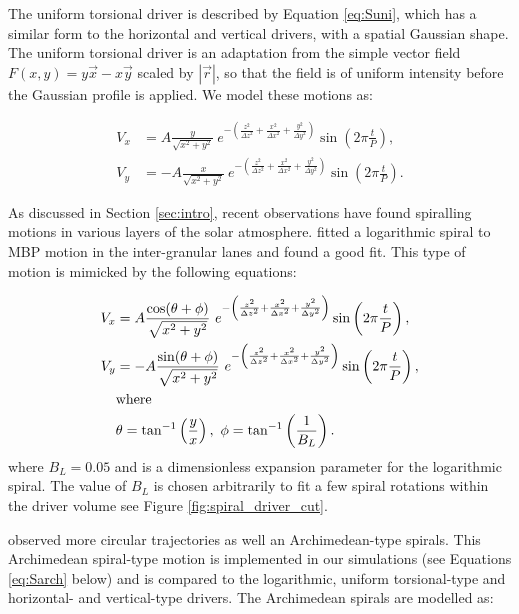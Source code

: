 The uniform torsional driver is described by Equation \ref{eq:Suni}, which has a similar form to the horizontal and vertical drivers, with a spatial Gaussian shape.
 The uniform torsional driver is an adaptation from the simple vector field $F(x,y) = y\vec{x} - x\vec{y}$ scaled by $|\vec{r}|$, so that the field is of uniform intensity before the Gaussian profile is applied. 
 We model these motions as:
 
\begin{subequations}
	\begin{align}
		V_x &= A \frac{y}{\sqrt{x^2 + y^2}}\ e^{-\left(\frac{z^2}{\Delta z^2} + \frac{x^2}{\Delta x^2} + \frac{y^2}{\Delta y^2}\right)} \sin \left(2\pi \frac{t}{P}\right), \label{eq:Suni}\\
		V_y &= - A \frac{x}{\sqrt{x^2 + y^2}}\ e^{-\left(\frac{z^2}{\Delta z^2} + \frac{x^2}{\Delta x^2} + \frac{y^2}{\Delta y^2}\right)} \sin \left(2\pi \frac{t}{P}\right).
	\end{align}
\end{subequations}

As discussed in Section \ref{sec:intro}, recent observations have found spiralling motions in various layers of the solar atmosphere.
 \citet{bonet2008} fitted a logarithmic spiral to MBP motion in the inter-granular lanes and found a good fit.
 This type of motion is mimicked by the following equations:
 
\begin{subequations}
\begin{align}
	V_x &= A \frac{\cos(\theta + \phi)}{\sqrt{x^2 + y^2}}\ e^{-\left(\frac{z^2}{\Delta z^2} + \frac{x^2}{\Delta x^2} + \frac{y^2}{\Delta y^2}\right)} \sin \left(2\pi \frac{t}{P}\right),\\
	V_y &= - A \frac{\sin(\theta + \phi)}{\sqrt{x^2 + y^2}}\ e^{-\left(\frac{z^2}{\Delta z^2} + \frac{x^2}{\Delta x^2} + \frac{y^2}{\Delta y^2}\right)} \sin \left(2\pi \frac{t}{P}\right),\label{eq:Slog}\\
		&\text{where}\notag\\
		&\theta = \tan^{-1}\left(\frac{y}{x}\right),\ \phi = \tan^{-1}\left(\frac{1}{B_L}\right).\notag	
\end{align}
\end{subequations}
where $B_L = 0.05$ and is a dimensionless expansion parameter for the logarithmic spiral. The value of $B_L$ is chosen arbitrarily to fit a few spiral rotations within the driver volume see Figure \ref{fig:spiral_driver_cut}.

\citet{wedemeyer-boehm2009} observed more circular trajectories as well an Archimedean-type spirals.
 This Archimedean spiral-type motion is implemented in our simulations (see Equations \ref{eq:Sarch} below) and is compared to the logarithmic, uniform torsional-type and horizontal- and vertical-type drivers. 
 The Archimedean spirals are modelled as:
 
